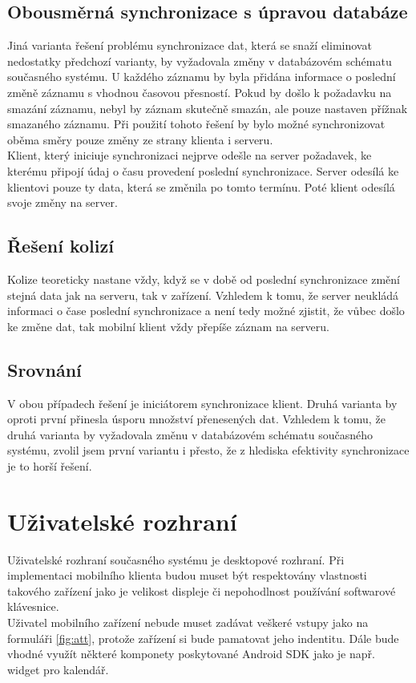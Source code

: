 \documentclass{diplomka}
\begin{document}
\subsection{Obousměrná synchronizace s úpravou databáze}
Jiná varianta řešení problému synchronizace dat, která se snaží eliminovat nedostatky předchozí varianty, by vyžadovala změny v databázovém schématu současného systému. U každého záznamu by byla přidána informace o poslední změně záznamu s vhodnou časovou přesností. Pokud by došlo k požadavku na smazání záznamu, nebyl by záznam skutečně smazán, ale pouze nastaven přížnak smazaného záznamu. Při použití tohoto řešení by bylo možné synchronizovat oběma směry pouze změny ze strany klienta i serveru. \\ \indent
Klient, který iniciuje synchronizaci nejprve odešle na server požadavek, ke kterému připojí údaj o času provedení poslední synchronizace. Server odesílá ke klientovi pouze ty data, která se změnila po tomto termínu. Poté klient odesílá svoje změny na server.

\subsection{Řešení kolizí}
Kolize teoreticky nastane vždy, když se v době od poslední synchronizace změní stejná data jak na serveru, tak v zařízení. Vzhledem k tomu, že server neukládá informaci o čase poslední synchronizace a není tedy možné zjistit, že vůbec došlo ke změne dat, tak mobilní klient vždy přepíše záznam na serveru.

\subsection{Srovnání}
V obou případech řešení je iniciátorem synchronizace klient. Druhá varianta by oproti první přinesla úsporu množství přenesených dat. Vzhledem k tomu, že druhá varianta by vyžadovala změnu v databázovém schématu současného systému, zvolil jsem první variantu i přesto, že z hlediska efektivity synchronizace je to horší řešení.

\section{Uživatelské rozhraní}
Uživatelské rozhraní současného systému je desktopové rozhraní. Při implementaci mobilního klienta budou muset být respektovány vlastnosti takového zařízení jako je velikost displeje či nepohodlnost používání softwarové klávesnice.\\
\indent Uživatel mobilního zařízení nebude muset zadávat veškeré vstupy jako na formuláři \ref{fig:att}, protože zařízení si bude pamatovat jeho indentitu. Dále bude vhodné využít některé komponety poskytované Android SDK jako je např. widget pro kalendář.
\end{document}
